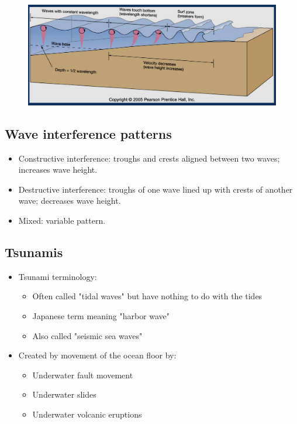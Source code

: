 \begin{figure}[H]
    \centering
    \includegraphics[width=0.9\linewidth]{img/wave_surf_zone.png}
\end{figure}

\subsection{Wave interference patterns}

\begin{itemize}
    \item Constructive interference: troughs and crests aligned between
        two waves; increases wave height.
    \item Destructive interference: troughs of one wave lined up
        with crests of another wave; decreases wave height.
    \item Mixed: variable pattern.
\end{itemize}

\subsection{Tsunamis}

\begin{itemize}
    \item Tsunami terminology:
        \begin{itemize}
            \item Often called "tidal waves" but have nothing
                to do with the tides
            \item Japanese term meaning "harbor wave"
            \item Also called "seismic sea waves"
        \end{itemize}
    \item Created by movement of the ocean floor by:
        \begin{itemize}
            \item Underwater fault movement
            \item Underwater slides
            \item Underwater volcanic eruptions
        \end{itemize}
\end{itemize}


